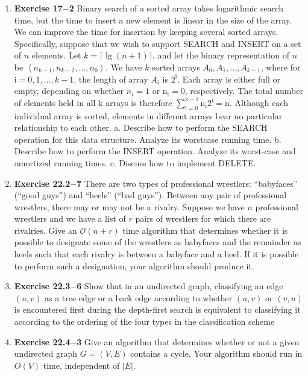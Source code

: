 \documentclass[a4paper,11pt,oneside]{book}
\begin{document}
\begin{enumerate}
  \item {\textbf{Exercise 17$-$2}} Binary search of a sorted array takes logarithmic search time, but the time to insert a new
  element is linear in the size of the array. We can improve the time for insertion by keeping
  several sorted arrays. Specifically, suppose that we wish to support SEARCH and INSERT on a
  set of $n$ elements. Let $k=\lceil\lg (n+1)\rceil$, and let the binary representation of $n$ be $\left\langle n_{k-1}, n_{k-2}, \ldots, n_0\right\rangle$. We have $k$ sorted arrays $A_0, A_1, \ldots, A_{k-1}$, where for $\mathrm{i}=0,1, \ldots, k-1$, the length of array $A_i$ is $2^{\mathrm{i}}$. Each array is either full or empty, depending on whether $n_i=1$ or $\mathrm{n}_{\mathrm{i}}=0$, respectively. The total number of elements held in all $\mathrm{k}$ arrays is therefore $\sum_{\mathrm{i}=0}^{\mathrm{k}-1} \mathrm{n}_{\mathrm{i}} 2^{\mathrm{i}}=\mathrm{n}$. Although each individual array is sorted, elements in different arrays bear no particular relationship to each other.
a. Describe how to perform the SEARCH operation for this data structure. Analyze its worstcase running time.
b. Describe how to perform the INSERT operation. Analyze its worst-case and amortized running times.
c. Discuss how to implement DELETE.


  \item {\textbf{Exercise 22.2$-$7}} There are two types of professional wrestlers: “babyfaces” (“good guys”) and “heels” (“bad guys”).
  Between any pair of professional wrestlers, there may or may not be a rivalry. Suppose we have $n$
  professional wrestlers and we have a list of $r$ pairs of wrestlers for which there are rivalries. Give an
  $\mathcal{O}(n+r)$ time algorithm that determines whether it is possible to designate some of the wrestlers as
  babyfaces and the remainder as heels such that each rivalry is between a babyface and a heel. If it is
  possible to perform such a designation, your algorithm should produce it.

  \item {\textbf{Exercise 22.3$-$6}} Show that in an undirected graph, classifying an edge $(u, v)$ as a tree edge or a back edge
  according to whether $(u, v)$ or $(v, u)$ is encountered first during the depth-first search is
  equivalent to classifying it according to the ordering of the four types in the classification scheme

  \item {\textbf{Exercise 22.4$-$3}} Give an algorithm that determines whether or not a given undirected graph $G=(V, E)$ contains a cycle. Your algorithm should run in $O(V)$ time, independent of $|E|$.


\end{enumerate}
\end{document}

